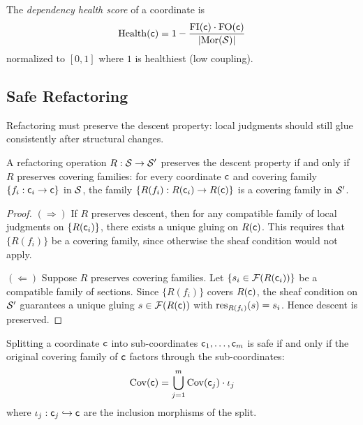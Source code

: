 \documentclass[11pt]{article}
\begin{document}
\begin{definition}\label{def:dep-health-score}
The \emph{dependency health score} of a coordinate is
\[
  \mathrm{Health}(\mathsf{c}) = 1 - \frac{\mathrm{FI}(\mathsf{c}) \cdot
  \mathrm{FO}(\mathsf{c})}{|\mathrm{Mor}(\mathcal{S})|}
\]
normalized to $[0, 1]$ where $1$ is healthiest (low coupling).
\end{definition}

\subsection{Safe Refactoring}\label{sec:safe-refactor}

Refactoring must preserve the descent property: local judgments should
still glue consistently after structural changes.

\begin{theorem}\label{thm:safe-refactor}
A refactoring operation $R : \mathcal{S} \to \mathcal{S}'$ preserves the descent
property if and only if $R$ preserves covering families: for every
coordinate $\mathsf{c}$ and covering family $\{f_i : \mathsf{c}_i \to \mathsf{c}\}$
in $\mathcal{S}$, the family $\{R(f_i) : R(\mathsf{c}_i) \to R(\mathsf{c})\}$ is a
covering family in $\mathcal{S}'$.
\end{theorem}

\begin{proof}
$(\Rightarrow)$ If $R$ preserves descent, then for any compatible family
of local judgments on $\{R(\mathsf{c}_i)\}$, there exists a unique gluing on
$R(\mathsf{c})$.  This requires that $\{R(f_i)\}$ be a covering family, since
otherwise the sheaf condition would not apply.

$(\Leftarrow)$ Suppose $R$ preserves covering families.  Let
$\{s_i \in \mathcal{F}(R(\mathsf{c}_i))\}$ be a compatible family of sections.
Since $\{R(f_i)\}$ covers $R(\mathsf{c})$, the sheaf condition on $\mathcal{S}'$
guarantees a unique gluing $s \in \mathcal{F}(R(\mathsf{c}))$ with
$\mathrm{res}_{R(f_i)}(s) = s_i$.  Hence descent is preserved.
\end{proof}

\begin{proposition}\label{prop:split-safety}
Splitting a coordinate $\mathsf{c}$ into sub-coordinates
$\mathsf{c}_1, \ldots, \mathsf{c}_m$ is safe if and only if the original covering
family of $\mathsf{c}$ factors through the sub-coordinates:
\[
  \mathrm{Cov}(\mathsf{c}) = \bigcup_{j=1}^{m} \mathrm{Cov}(\mathsf{c}_j) \cdot \iota_j
\]
where $\iota_j : \mathsf{c}_j \hookrightarrow \mathsf{c}$ are the inclusion
morphisms of the split.
\end{proposition}
\end{document}
